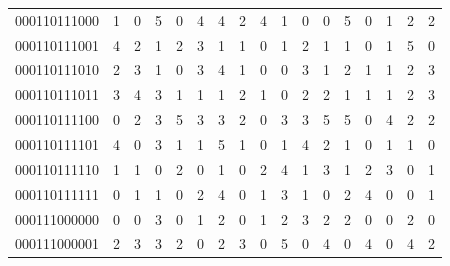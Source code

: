 \documentclass[10pt,a4paper]{article}
\begin{document}
\begin{longtable}{ |c|c|c|c|c|c|c|c|c|c|c|c|c|c|c|c|c| }
    000110111000              & 1                            & 0                                & 5                            & 0                              & 4   & 4   & 2   & 4   & 1   & 0   & 0   & 5   & 0   & 1   & 2   & 2   \\
    000110111001              & 4                            & 2                                & 1                            & 2                              & 3   & 1   & 1   & 0   & 1   & 2   & 1   & 1   & 0   & 1   & 5   & 0   \\
    000110111010              & 2                            & 3                                & 1                            & 0                              & 3   & 4   & 1   & 0   & 0   & 3   & 1   & 2   & 1   & 1   & 2   & 3   \\
    000110111011              & 3                            & 4                                & 3                            & 1                              & 1   & 1   & 2   & 1   & 0   & 2   & 2   & 1   & 1   & 1   & 2   & 3   \\
    000110111100              & 0                            & 2                                & 3                            & 5                              & 3   & 3   & 2   & 0   & 3   & 3   & 5   & 5   & 0   & 4   & 2   & 2   \\
    000110111101              & 4                            & 0                                & 3                            & 1                              & 1   & 5   & 1   & 0   & 1   & 4   & 2   & 1   & 0   & 1   & 1   & 0   \\
    000110111110              & 1                            & 1                                & 0                            & 2                              & 0   & 1   & 0   & 2   & 4   & 1   & 3   & 1   & 2   & 3   & 0   & 1   \\
    000110111111              & 0                            & 1                                & 1                            & 0                              & 2   & 4   & 0   & 1   & 3   & 1   & 0   & 2   & 4   & 0   & 0   & 1   \\
    000111000000              & 0                            & 0                                & 3                            & 0                              & 1   & 2   & 0   & 1   & 2   & 3   & 2   & 2   & 0   & 0   & 2   & 0   \\
    000111000001              & 2                            & 3                                & 3                            & 2                              & 0   & 2   & 3   & 0   & 5   & 0   & 4   & 0   & 4   & 0   & 4   & 2   \\

\end{longtable}
\end{document}
